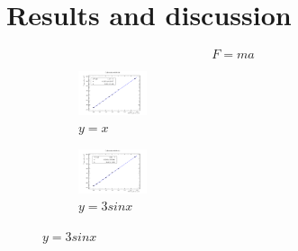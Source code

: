 \chapter{Results and discussion}

\lipsum[1-3]

\begin{equation}
    F = ma
\end{equation}


\begin{figure}
    \centering
    \begin{subfigure}[b]{0.15\textwidth}
        \centering
        \includegraphics[width=2cm]{figures/ch0.pdf}
        \caption{$y=x$}
        \label{fig:y equals x}
    \end{subfigure}
    \hfill
    \begin{subfigure}[b]{0.15\textwidth}
        \centering
        \includegraphics[width=2cm]{figures/ch1.pdf}
        \caption{$y=3sinx$}
        \label{fig:three sin x}
    \end{subfigure}
\end{figure}


